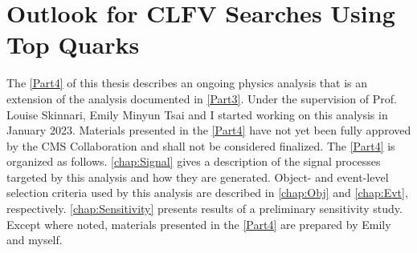 \part{Outlook for CLFV Searches Using Top Quarks}
\label{Part4}
The \autoref{Part4} of this thesis describes an ongoing physics analysis that is an extension of the analysis documented in \autoref{Part3}. Under the supervision of Prof. Louise Skinnari, Emily Minyun Tsai and I started working on this analysis in January 2023. Materials presented in the \autoref{Part4} have not yet been fully approved by the \ac{CMS} Collaboration and shall not be considered finalized. The \autoref{Part4} is organized as follows. \autoref{chap:Signal} gives a description of the signal processes targeted by this analysis and how they are generated. Object- and event-level selection criteria used by this analysis are described in \autoref{chap:Obj} and \autoref{chap:Evt}, respectively. \autoref{chap:Sensitivity} presents results of a preliminary sensitivity study. Except where noted, materials presented in the \autoref{Part4} are prepared by Emily and myself.




